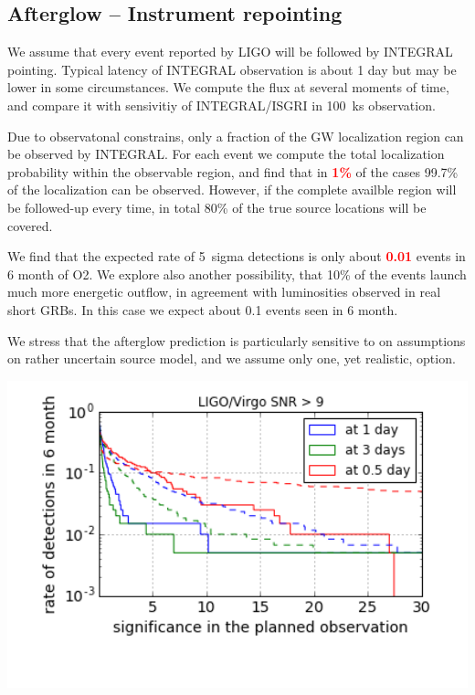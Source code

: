 \documentclass[a0,portrait]{a0poster}
\newcommand{\vs}[1] {\textbf{\textcolor{red}{#1}}}
\begin{document}
\begin{multicols}{2}
\subsection*{Afterglow -- Instrument repointing}


We assume that every event reported by LIGO will be followed by
INTEGRAL pointing. Typical latency of INTEGRAL observation is about 1
day but may be lower in some circumstances. We compute the flux at
several moments of time, and compare it with sensivitiy of
INTEGRAL/ISGRI in 100~ks observation.

Due to observatonal constrains, only a fraction of the GW localization
region can be observed by INTEGRAL. For each event we compute the
total localization probability within the observable region, and find
that in \vs{1\%} of the cases 99.7\% of the localization can be
observed. However, if the complete availble region will be followed-up
every time, in total 80\% of the true source locations will be
covered.

We find that the expected rate of 5~sigma detections is only about
\vs{0.01} events in 6 month of O2. We explore also another
possibility, that 10\% of the events launch much more energetic
outflow, in agreement with luminosities observed in real short
GRBs. In this case we expect about 0.1 events seen in 6 month. 

We stress that the afterglow prediction is particularly sensitive to
on assumptions on rather uncertain source model, and we assume only
one, yet realistic, option.

\begin{center}\vspace{.5cm}
    \includegraphics[width=20cm]{figures/significance_vs_rate_af.png}
    \label{covered_region}
\end{center}


\end{multicols}
\end{document}
